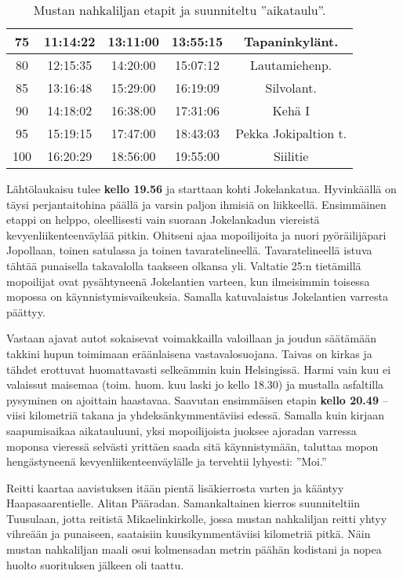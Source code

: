 \begin{multicols}{2}
\begin{table*}[t]
\begin{tabular}{|c|ccc|c|}
75 & \multicolumn{1}{c|}{11:14:22} & \multicolumn{1}{c|}{13:11:00} & 13:55:15 & Tapaninkylänt. \\ \hline
80 & \multicolumn{1}{c|}{12:15:35} & \multicolumn{1}{c|}{14:20:00} & 15:07:12 & Lautamiehenp. \\ \hline
85 & \multicolumn{1}{c|}{13:16:48} & \multicolumn{1}{c|}{15:29:00} & 16:19:09 & Silvolant. \\ \hline
90 & \multicolumn{1}{c|}{14:18:02} & \multicolumn{1}{c|}{16:38:00} & 17:31:06 & Kehä I \\ \hline
95 & \multicolumn{1}{c|}{15:19:15} & \multicolumn{1}{c|}{17:47:00} & 18:43:03 & Pekka Jokipaltion t. \\ \hline
100 & \multicolumn{1}{c|}{16:20:29} & \multicolumn{1}{c|}{18:56:00} & 19:55:00 & Siilitie \\ \hline
\end{tabular}
\caption{Mustan nahkaliljan etapit ja suunniteltu ''aikataulu''.}
\end{table*}

Lähtölaukaisu tulee \textbf{kello 19.56} ja starttaan kohti Jokelankatua. Hyvinkäällä on täysi perjantaitohina päällä ja varsin paljon ihmisiä on liikkeellä. Ensimmäinen etappi on helppo, oleellisesti vain suoraan Jokelankadun viereistä kevyenliikenteenväylää pitkin. Ohitseni ajaa mopoilijoita ja nuori pyöräilijäpari Jopollaan, toinen satulassa ja toinen tavaratelineellä. Tavaratelineellä istuva tähtää punaisella takavalolla taakseen olkansa yli. Valtatie 25:n tietämillä mopoilijat ovat pysähtyneenä Jokelantien varteen, kun ilmeisimmin toisessa mopossa on käynnistymisvaikeuksia. Samalla katuvalaistus Jokelantien varresta päättyy.

Vastaan ajavat autot sokaisevat voimakkailla valoillaan ja joudun säätämään takkini hupun toimimaan eräänlaisena vastavalosuojana. Taivas on kirkas ja tähdet erottuvat huomattavasti selkeämmin kuin Helsingissä. Harmi vain kuu ei valaissut maisemaa (toim. huom. kuu laski jo kello 18.30) ja mustalla asfaltilla pysyminen on ajoittain haastavaa. Saavutan ensimmäisen etapin \textbf{kello 20.49} -- viisi kilometriä takana ja yhdeksänkymmentäviisi edessä. Samalla kuin kirjaan saapumisaikaa aikatauluuni, yksi mopoilijoista juoksee ajoradan varressa moponsa vieressä selvästi yrittäen saada sitä käynnistymään, taluttaa mopon hengästyneenä kevyenliikenteenväylälle ja tervehtii lyhyesti: ''Moi.''

Reitti kaartaa aavistuksen itään pientä lisäkierrosta varten ja kääntyy Haapasaarentielle. Alitan Pääradan. Samankaltainen kierros suunniteltiin Tuusulaan, jotta reitistä Mikaelinkirkolle, jossa mustan nahkaliljan reitti yhtyy vihreään ja punaiseen, saataisiin kuusikymmentäviisi kilometriä pitkä. Näin mustan nahkaliljan maali osui kolmensadan metrin päähän kodistani ja nopea huolto suorituksen jälkeen oli taattu.


\end{multicols}
